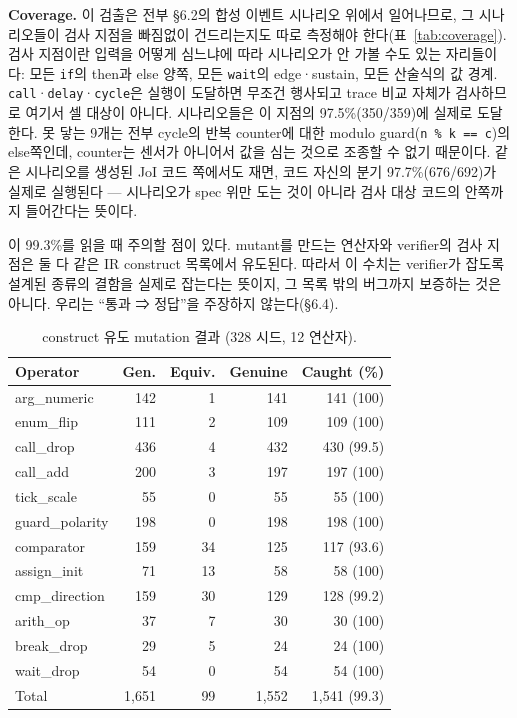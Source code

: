 \documentclass[sigconf,nonacm,anonymous,review]{acmart}
\begin{document}
\textbf{Coverage.} 이 검출은 전부 \S6.2의 합성 이벤트 시나리오 위에서 일어나므로, 그 시나리오들이 검사 지점을 빠짐없이 건드리는지도 따로 측정해야 한다(표~\ref{tab:coverage}). 검사 지점이란 입력을 어떻게 심느냐에 따라 시나리오가 안 가볼 수도 있는 자리들이다: 모든 \texttt{if}의 then과 else 양쪽, 모든 \texttt{wait}의 edge·sustain, 모든 산술식의 값 경계. \texttt{call}·\texttt{delay}·\texttt{cycle}은 실행이 도달하면 무조건 행사되고 trace 비교 자체가 검사하므로 여기서 셀 대상이 아니다. 시나리오들은 이 지점의 97.5\%(350/359)에 실제로 도달한다. 못 닿는 9개는 전부 cycle의 반복 counter에 대한 modulo guard(\texttt{n \% k == c})의 else쪽인데, counter는 센서가 아니어서 값을 심는 것으로 조종할 수 없기 때문이다. 같은 시나리오를 생성된 JoI 코드 쪽에서도 재면, 코드 자신의 분기 97.7\%(676/692)가 실제로 실행된다 — 시나리오가 spec 위만 도는 것이 아니라 검사 대상 코드의 안쪽까지 들어간다는 뜻이다.

이 99.3\%를 읽을 때 주의할 점이 있다. mutant를 만드는 연산자와 verifier의 검사 지점은 둘 다 같은 IR construct 목록에서 유도된다. 따라서 이 수치는 verifier가 잡도록 설계된 종류의 결함을 실제로 잡는다는 뜻이지, 그 목록 밖의 버그까지 보증하는 것은 아니다. 우리는 ``통과 ⇒ 정답''을 주장하지 않는다(\S6.4).

\begin{table}[t]
\centering
\caption{construct 유도 mutation 결과 (328 시드, 12 연산자).}
\label{tab:mutation}
\small
\setlength{\tabcolsep}{4.5pt}
\begin{tabular}{lrrrr}
\toprule
Operator & Gen. & Equiv. & Genuine & Caught (\%) \\
\midrule
arg\_numeric    & 142 & 1  & 141 & 141 (100) \\
enum\_flip      & 111 & 2  & 109 & 109 (100) \\
call\_drop      & 436 & 4  & 432 & 430 (99.5) \\
call\_add       & 200 & 3  & 197 & 197 (100) \\
tick\_scale     & 55  & 0  & 55  & 55 (100) \\
guard\_polarity & 198 & 0  & 198 & 198 (100) \\
comparator      & 159 & 34 & 125 & 117 (93.6) \\
assign\_init    & 71  & 13 & 58  & 58 (100) \\
cmp\_direction  & 159 & 30 & 129 & 128 (99.2) \\
arith\_op       & 37  & 7  & 30  & 30 (100) \\
break\_drop     & 29  & 5  & 24  & 24 (100) \\
wait\_drop      & 54  & 0  & 54  & 54 (100) \\
\midrule
Total           & 1,651 & 99 & 1,552 & 1,541 (99.3) \\
\bottomrule
\end{tabular}
\end{table}
\end{document}
